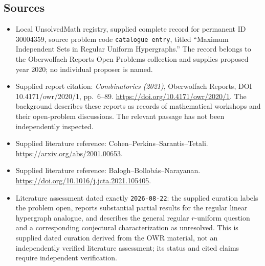 \documentclass[11pt]{article}
\begin{document}
\subsection{Sources}
\begin{itemize}
\item Local UnsolvedMath registry, supplied complete record for permanent ID \(30004359\), source problem code \texttt{catalogue entry}, titled ``Maximum Independent Sets in Regular Uniform Hypergraphs.'' The record belongs to the Oberwolfach Reports Open Problems collection and supplies proposed year 2020; no individual proposer is named.
\item Supplied report citation: \emph{Combinatorics (2021)}, Oberwolfach Reports, DOI 10.4171/owr/2020/1, pp.\ 6--89. \url{https://doi.org/10.4171/owr/2020/1}. The background describes these reports as records of mathematical workshops and their open-problem discussions. The relevant passage has not been independently inspected.
\item Supplied literature reference: Cohen--Perkins--Sarantis--Tetali. \url{https://arxiv.org/abs/2001.00653}.
\item Supplied literature reference: Balogh--Bollob\'as--Narayanan. \url{https://doi.org/10.1016/j.jcta.2021.105405}.
\item Literature assessment dated exactly \texttt{2026-08-22}: the supplied curation labels the problem open, reports substantial partial results for the regular linear hypergraph analogue, and describes the general regular \(r\)-uniform question and a corresponding conjectural characterization as unresolved. This is supplied dated curation derived from the OWR material, not an independently verified literature assessment; its status and cited claims require independent verification.
\end{itemize}
\end{document}
